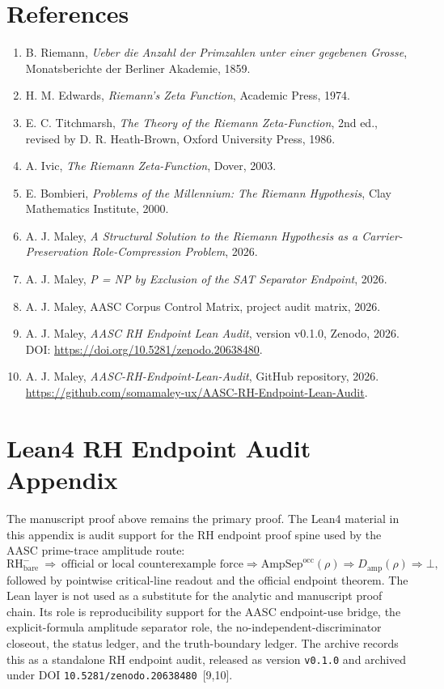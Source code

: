 \documentclass[11pt]{article}
\newcommand{\RH}{\mathrm{RH}}
\newcommand{\AmpSepOcc}{\mathrm{AmpSep}^{\mathrm{occ}}}
\newcommand{\Damp}{D_{\mathrm{amp}}}
\begin{document}
\section{References}
\begin{enumerate}
\item B. Riemann, \emph{Ueber die Anzahl der Primzahlen unter einer gegebenen Grosse}, Monatsberichte der Berliner Akademie, 1859.
\item H. M. Edwards, \emph{Riemann's Zeta Function}, Academic Press, 1974.
\item E. C. Titchmarsh, \emph{The Theory of the Riemann Zeta-Function}, 2nd ed., revised by D. R. Heath-Brown, Oxford University Press, 1986.
\item A. Ivic, \emph{The Riemann Zeta-Function}, Dover, 2003.
\item E. Bombieri, \emph{Problems of the Millennium: The Riemann Hypothesis}, Clay Mathematics Institute, 2000.
\item A. J. Maley, \emph{A Structural Solution to the Riemann Hypothesis as a Carrier-Preservation Role-Compression Problem}, 2026.
\item A. J. Maley, \emph{P = NP by Exclusion of the SAT Separator Endpoint}, 2026.
\item A. J. Maley, AASC Corpus Control Matrix, project audit matrix, 2026.
\item A. J. Maley, \emph{AASC RH Endpoint Lean Audit}, version v0.1.0, Zenodo, 2026. DOI: \url{https://doi.org/10.5281/zenodo.20638480}.\label{MaleyRHEndpointLeanAuditZenodo}
\item A. J. Maley, \emph{AASC-RH-Endpoint-Lean-Audit}, GitHub repository, 2026. \url{https://github.com/somamaley-ux/AASC-RH-Endpoint-Lean-Audit}.\label{MaleyRHEndpointLeanAuditGitHub}
\end{enumerate}

\clearpage
\appendix

\clearpage
\section{Lean4 RH Endpoint Audit Appendix}\label{app:lean-rh-audit}

The manuscript proof above remains the primary proof.  The Lean4 material in this appendix is audit support for the RH endpoint proof spine used by the AASC prime-trace amplitude route:
\[
\RH^-_{\mathrm{bare}}\ \Longrightarrow\ \text{official or local counterexample force}
\Longrightarrow \AmpSepOcc(\rho)
\Longrightarrow \Damp(\rho)
\Longrightarrow \bot,
\]
followed by pointwise critical-line readout and the official endpoint theorem.  The Lean layer is not used as a substitute for the analytic and manuscript proof chain.  Its role is reproducibility support for the AASC endpoint-use bridge, the explicit-formula amplitude separator role, the no-independent-discriminator closeout, the status ledger, and the truth-boundary ledger.  The archive records this as a standalone RH endpoint audit, released as version \texttt{v0.1.0} and archived under DOI \texttt{10.5281/zenodo.20638480}~[9,10].
\end{document}
